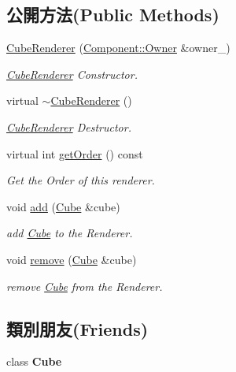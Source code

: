 \subsection*{公開方法(Public Methods)}
\begin{DoxyCompactItemize}
\item 
\hyperlink{class_i_dream_sky_1_1_cube_renderer_a538ada54c52c792555b2205dd7568d09}{Cube\+Renderer} (\hyperlink{class_i_dream_sky_1_1_component_1_1_owner}{Component\+::\+Owner} \&owner\+\_\+)
\begin{DoxyCompactList}\small\item\em \hyperlink{class_i_dream_sky_1_1_cube_renderer}{Cube\+Renderer} Constructor. \end{DoxyCompactList}\item 
virtual \hyperlink{class_i_dream_sky_1_1_cube_renderer_ae24a7fda5b2b2db4fe36d8d0343e7de9}{$\sim$\+Cube\+Renderer} ()
\begin{DoxyCompactList}\small\item\em \hyperlink{class_i_dream_sky_1_1_cube_renderer}{Cube\+Renderer} Destructor. \end{DoxyCompactList}\item 
virtual int \hyperlink{class_i_dream_sky_1_1_cube_renderer_a6635459b90a33f12eec2d58f4d930984}{get\+Order} () const 
\begin{DoxyCompactList}\small\item\em Get the Order of this renderer. \end{DoxyCompactList}\item 
void \hyperlink{class_i_dream_sky_1_1_cube_renderer_aa3d6530c6f3af5073de9269d31ccbddc}{add} (\hyperlink{class_i_dream_sky_1_1_cube}{Cube} \&cube)
\begin{DoxyCompactList}\small\item\em add \hyperlink{class_i_dream_sky_1_1_cube}{Cube} to the Renderer. \end{DoxyCompactList}\item 
void \hyperlink{class_i_dream_sky_1_1_cube_renderer_a0ee1e417798a21ad7276c90d327226ed}{remove} (\hyperlink{class_i_dream_sky_1_1_cube}{Cube} \&cube)
\begin{DoxyCompactList}\small\item\em remove \hyperlink{class_i_dream_sky_1_1_cube}{Cube} from the Renderer. \end{DoxyCompactList}\end{DoxyCompactItemize}
\subsection*{類別朋友(Friends)}
\begin{DoxyCompactItemize}
\item 
class {\bfseries Cube}\hypertarget{class_i_dream_sky_1_1_cube_renderer_a8faee6be39d1c71eee071a7874631653}{}\label{class_i_dream_sky_1_1_cube_renderer_a8faee6be39d1c71eee071a7874631653}

\end{DoxyCompactItemize}
